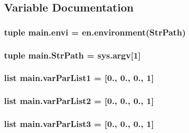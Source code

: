 \subsection{Variable Documentation}
\hypertarget{namespacemain_a8d16a33178bd55a2cdb8587ca56fb2b6}{
\subsubsection[{envi}]{\setlength{\rightskip}{0pt plus 5cm}tuple main.\-envi = en.\-environment({\bf Str\-Path})}}\label{namespacemain_a8d16a33178bd55a2cdb8587ca56fb2b6}
\hypertarget{namespacemain_a8cb6cd8a3bdb1542daaf5064a2b14a2f}{
\subsubsection[{Str\-Path}]{\setlength{\rightskip}{0pt plus 5cm}tuple main.\-Str\-Path = sys.\-argv\mbox{[}1\mbox{]}}}\label{namespacemain_a8cb6cd8a3bdb1542daaf5064a2b14a2f}
\hypertarget{namespacemain_a153a60cf40f7ed036e2643a50dfbe15a}{
\subsubsection[{var\-Par\-List1}]{\setlength{\rightskip}{0pt plus 5cm}list main.\-var\-Par\-List1 = \mbox{[}0., 0., 0., 1\mbox{]}}}\label{namespacemain_a153a60cf40f7ed036e2643a50dfbe15a}
\hypertarget{namespacemain_a29fdd8f127575fd8ea9e1213c435cbc4}{
\subsubsection[{var\-Par\-List2}]{\setlength{\rightskip}{0pt plus 5cm}list main.\-var\-Par\-List2 = \mbox{[}0., 0., 0., 1\mbox{]}}}\label{namespacemain_a29fdd8f127575fd8ea9e1213c435cbc4}
\hypertarget{namespacemain_a807eb3022f203ffcc616a858728f0305}{
\subsubsection[{var\-Par\-List3}]{\setlength{\rightskip}{0pt plus 5cm}list main.\-var\-Par\-List3 = \mbox{[}0., 0., 0., 1\mbox{]}}}\label{namespacemain_a807eb3022f203ffcc616a858728f0305}
